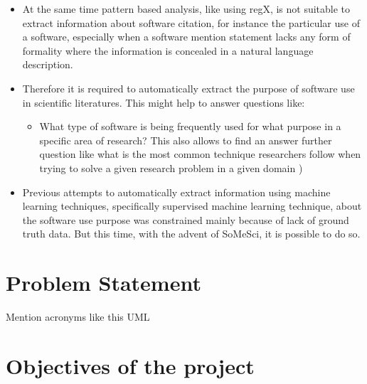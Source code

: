 \begin{itemize}
\begin{itemize}
			\end{itemize}

	\item At the same time pattern based analysis, like using regX, is not suitable to extract information about software citation, for instance the particular use of a software, especially when a software mention statement lacks any form of formality where the information is concealed in a natural language description. 
	\item Therefore it is required to automatically extract the purpose of software use in scientific literatures. This might help to answer questions like:
		
		\begin{itemize}
			\item What type of software is being frequently used for what purpose in a specific area of research? This also allows to find an answer further question like what is  the most common technique researchers follow when trying to solve a given research problem in a given domain )


		\end{itemize}	
	\item Previous attempts to automatically extract information using machine learning techniques, specifically supervised machine learning technique, about the software use purpose was constrained mainly because of lack of ground truth data. But this time, with the advent of SoMeSci, it is possible to do so. 	
	
\end{itemize}


%
%
\section{Problem Statement}
\label{sec:intro:problems}

Mention acronyms like this  \ac{UML} 


%
%
\section{Objectives of the project}
\label{sec:intro:objectives}

